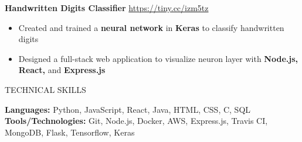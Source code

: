 \documentclass[letterpaper,11pt,oneside]{article}
\newcommand{\createHeading}[1]{
    \vspace{1.25em}
    \hline
    \vspace{-1.5ex}
    \begin{center}
        #1
    \end{center}
    \vspace{-1.5ex}
    \hline
    \vspace{1.25em}
}
\begin{document}
\begin{addmargin}[.6em]{.6em}
\begin{itemize}
    \end{itemize}
    \vspace{1.25em}
    \textbf{Handwritten Digits Classifier} \hfill \href{https://handwritten-digits-ai.netlify.app/}{https://tiny.cc/izm5tz}
    \begin{itemize}
        \item Created and trained a \textbf{neural network} in \textbf{Keras} to classify handwritten digits
        \item Designed a full-stack web application to visualize neuron layer with \textbf{Node.js, React,} and \textbf{Express.js} 
    \end{itemize}
    \vspace{0.5em}
\end{addmargin}

\createHeading{TECHNICAL SKILLS}
\begin{addmargin}[.6em]{.6em}
    \textbf{Languages: } Python, JavaScript, React, Java, HTML, CSS, C, SQL \\
    \textbf{Tools/Technologies: } Git, Node.js, Docker, AWS, Express.js, Travis CI, MongoDB, Flask, Tensorflow, Keras
\end{addmargin}
\end{document}
